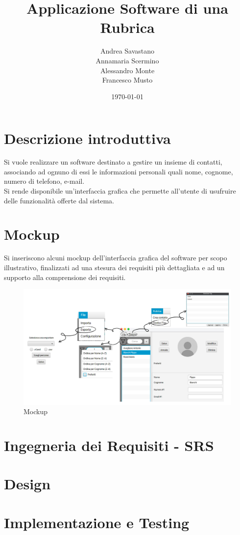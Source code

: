 \documentclass[12pt, a4paper]{article}
\title{\Huge Applicazione Software di una Rubrica}
\author{Andrea Savastano 
	\\ Annamaria Scermino
	\\ Alessandro Monte 
	\\ Francesco Musto}
\date{\today}
\newcommand{\disablelinkcolor}{%
	\hypersetup{linkcolor=black}%
}
\newcommand{\enablelinkcolor}{
	\hypersetup{
	    linkcolor=blue
	}
}
\begin{document}
	\fancyhf{}
	\thispagestyle{fancy}
	
	\maketitle
	\newpage
\disablelinkcolor
	\tableofcontents 
	\listoffigures
	
\enablelinkcolor %
	
	\newpage
	\section*{Descrizione introduttiva}
	Si vuole realizzare un software destinato a gestire un insieme di contatti, associando ad ognuno di essi le informazioni personali quali nome, cognome, numero di telefono, e-mail.
	\vspace{.2cm}\\Si rende disponibile un'interfaccia grafica che permette all'utente di usufruire delle funzionalità offerte dal sistema.
	
	\section*{Mockup}
	Si inseriscono alcuni mockup dell'interfaccia grafica del software per scopo illustrativo, finalizzati ad una stesura dei requisiti più dettagliata e ad un supporto alla comprensione dei requisiti.
\begin{figure}[h]
	\centering
	\includegraphics[width=\linewidth]{images/mockup.png}
	\caption{Mockup}
	\label{mockup}			
\end{figure}
	
	
	\newpage
	\fancyhf{} %
	\fancyhead[L]{\nouppercase{\leftmark}} %
	
	\section{Ingegneria dei Requisiti - SRS}
	
	
	\newpage
	\section{Design}
	
	
	\newpage
	\section{Implementazione e Testing}
	
	
\end{document}

